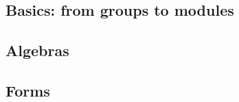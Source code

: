 \subsection{Basics: from groups to modules}
\label{sec:basics}



\subsection{Algebras}
\label{sec:algebras}



\subsection{Forms}
\label{sec:forms}



